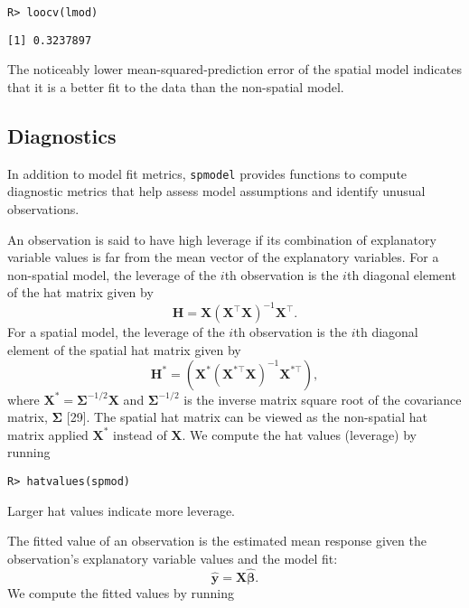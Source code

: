 \documentclass[10pt,letterpaper]{article}
\begin{document}
\begin{verbatim}
R> loocv(lmod)
\end{verbatim}

\begin{verbatim}
[1] 0.3237897
\end{verbatim}

The noticeably lower mean-squared-prediction error of the spatial model
indicates that it is a better fit to the data than the non-spatial
model.

\hypertarget{diagnostics}{%
\subsection{Diagnostics}\label{diagnostics}}

In addition to model fit metrics, \texttt{spmodel} provides functions to
compute diagnostic metrics that help assess model assumptions and
identify unusual observations.

An observation is said to have high leverage if its combination of
explanatory variable values is far from the mean vector of the
explanatory variables. For a non-spatial model, the leverage of the
\(i\)th observation is the \(i\)th diagonal element of the hat matrix
given by \begin{equation*}
  \mathbf{H} = \mathbf{X}(\mathbf{X}^\top\mathbf{X})^{-1}\mathbf{X}^\top .
\end{equation*} For a spatial model, the leverage of the \(i\)th
observation is the \(i\)th diagonal element of the spatial hat matrix
given by \begin{equation*}
  \mathbf{H}^* = (\mathbf{X}^* (\mathbf{X}^{* \top} \mathbf{X})^{-1} \mathbf{X}^{* \top}) ,
\end{equation*} where
\(\mathbf{X}^* = \boldsymbol{\Sigma}^{-1/2}\mathbf{X}\) and
\(\boldsymbol{\Sigma}^{-1/2}\) is the inverse matrix square root of the
covariance matrix, \(\boldsymbol{\Sigma}\) {[}29{]}. The spatial hat
matrix can be viewed as the non-spatial hat matrix applied
\(\mathbf{X}^*\) instead of \(\mathbf{X}\). We compute the hat values
(leverage) by running

\begin{verbatim}
R> hatvalues(spmod)
\end{verbatim}

Larger hat values indicate more leverage.

The fitted value of an observation is the estimated mean response given
the observation's explanatory variable values and the model fit:
\begin{equation*}
  \hat{\mathbf{y}} = \mathbf{X} \hat{\boldsymbol{\beta}}.
\end{equation*} We compute the fitted values by running
\end{document}
